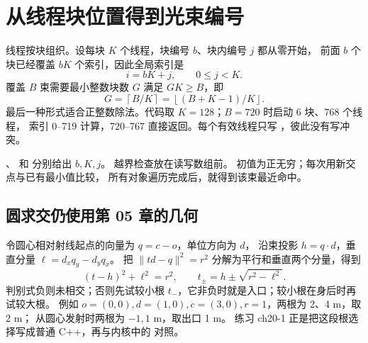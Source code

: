 \section{从线程块位置得到光束编号}
线程按块组织。设每块 $K$ 个线程，块编号 $b$、块内编号 $j$ 都从零开始，
前面 $b$ 个块已经覆盖 $bK$ 个索引，因此全局索引是
\[
 i=bK+j,\qquad 0\le j<K.
\]
覆盖 $B$ 束需要最小整数块数 $G$ 满足 $GK\ge B$，即
\[
 G=\left\lceil B/K\right\rceil
  =\left\lfloor(B+K-1)/K\right\rfloor.
\]
最后一种形式适合正整数除法。代码取 $K=128$；$B=720$ 时启动 6 块、768 个线程，
索引 0--719 计算，720--767 直接返回。每个有效线程只写 ，彼此没有写冲突。

\begin{center}\begin{minipage}{\linewidth}\makeatletter{}\makeatother
\centering
{}
\caption{用每块 8 个线程画出的 $B=18$ 小例子。实际代码每块 128 个线程，索引算法完全相同。}
\end{minipage}\end{center}


、 和  分别给出 $b,K,j$。
越界检查放在读写数组前。 初值为正无穷；每次用新交点与已有最小值比较，
所有对象遍历完成后，就得到该束最近命中。

\subsection{圆求交仍使用第 05 章的几何}
令圆心相对射线起点的向量为 $q=c-o$，单位方向为 $d$，
沿束投影 $h=q\cdot d$，垂直分量 $\ell=d_xq_y-d_yq_x$。
把 $\|td-q\|^2=r^2$ 分解为平行和垂直两个分量，得到
\[
 (t-h)^2+\ell^2=r^2,\qquad t_\pm=h\pm\sqrt{r^2-\ell^2}.
\]
判别式负则未相交；否则先试较小根 $t_-$，它非负时就是入口；较小根在身后时再试较大根。
例如 $o=(0,0),d=(1,0),c=(3,0),r=1$，两根为 2、4 m，取 2 m；
从圆心发射时两根为 $-1,1$ m，取出口 1 m。
练习 ch20-1 正是把这段根选择写成普通 C++，再与内核中的  对照。

